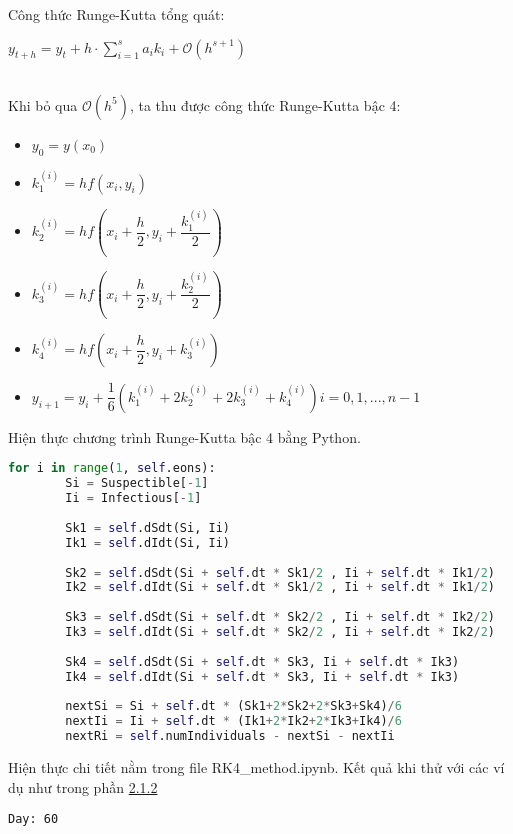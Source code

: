 \documentclass[a4paper]{article}
\begin{document}
Công thức Runge-Kutta tổng quát:
\begin{center}
    $y_{t+h}=y_{t}+h\cdot \sum _{i=1}^{s}a_{i}k_{i}+{\mathcal {O}}(h^{s+1})$\\~\\
\end{center}

Khi bỏ qua ${\mathcal {O}}(h^{5})$, ta thu được công thức Runge-Kutta bậc 4:
\begin{itemize}
    \item $y_0 = y(x_0)$
    \item $k_1^{(i)} = hf(x_i, y_i)$
    \item $k_2^{(i)} = hf(x_i + \dfrac{h}{2}, y_i + \dfrac{k_1^{(i)}}{2})$
    \item $k_3^{(i)} = hf(x_i + \dfrac{h}{2}, y_i + \dfrac{k_2^{(i)}}{2})$
    \item $k_4^{(i)} = hf(x_i + \dfrac{h}{2}, y_i + k_3^{(i)})$
    \item $y_{i+1} = y_i +\dfrac{1}{6}( k_1^{(i)} + 2k_2^{(i)} + 2k_3^{(i)} + k_4^{(i)})   i=0,1,...,n-1$
\end{itemize}

Hiện thực chương trình Runge-Kutta bậc 4 bằng Python.
\begin{lstlisting}[language=Python]
     for i in range(1, self.eons):
        Si = Suspectible[-1]
        Ii = Infectious[-1]
        
        Sk1 = self.dSdt(Si, Ii)
        Ik1 = self.dIdt(Si, Ii)
            
        Sk2 = self.dSdt(Si + self.dt * Sk1/2 , Ii + self.dt * Ik1/2)
        Ik2 = self.dIdt(Si + self.dt * Sk1/2 , Ii + self.dt * Ik1/2)
            
        Sk3 = self.dSdt(Si + self.dt * Sk2/2 , Ii + self.dt * Ik2/2)
        Ik3 = self.dIdt(Si + self.dt * Sk2/2 , Ii + self.dt * Ik2/2)
           
        Sk4 = self.dSdt(Si + self.dt * Sk3, Ii + self.dt * Ik3)
        Ik4 = self.dIdt(Si + self.dt * Sk3, Ii + self.dt * Ik3)
           
        nextSi = Si + self.dt * (Sk1+2*Sk2+2*Sk3+Sk4)/6
        nextIi = Ii + self.dt * (Ik1+2*Ik2+2*Ik3+Ik4)/6
        nextRi = self.numIndividuals - nextSi - nextIi
\end{lstlisting}

Hiện thực chi tiết nằm trong file RK4\_method.ipynb. Kết quả khi thử với các ví dụ như trong phần \hyperref[sec: 2.1.2]{2.1.2}

\texttt{Day: 60}
\end{document}
